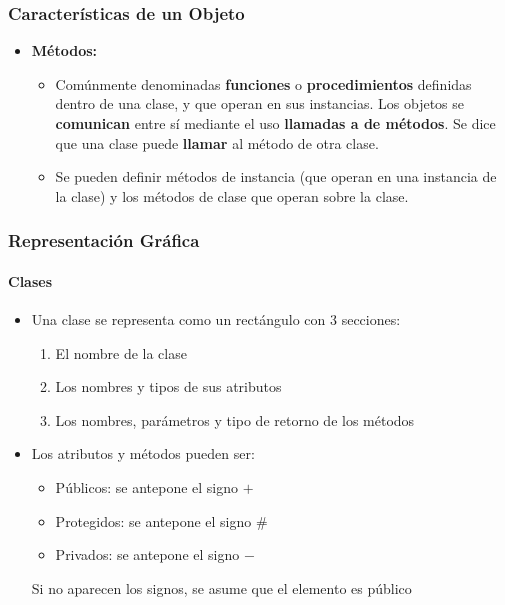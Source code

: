 \documentclass{beamer}
\begin{document}
\begin{frame}
  \frametitle{Características de un Objeto}

  \begin{itemize}
  \item \textbf{Métodos:}
    \begin{itemize}

    \item[] Comúnmente denominadas \textbf{funciones} o
      \textbf{procedimientos} definidas dentro de una clase, y que
      operan en sus instancias. Los objetos se \textbf{comunican}
      entre sí mediante el uso \textbf{llamadas a de métodos}. Se dice
      que una clase puede \textbf{llamar} al método de otra clase.
      
    \item[] Se pueden definir métodos de instancia (que operan en una
      instancia de la clase) y los métodos de clase que operan sobre
      la clase.
      
    \end{itemize}
  \end{itemize}
\end{frame}

\begin{frame}
  \frametitle{Representación Gráfica}
  \framesubtitle{Clases}

  \begin{itemize}
  \item Una clase se representa como un rectángulo con 3 secciones:
    \begin{enumerate}
    \item El nombre de la clase      
    \item Los nombres y tipos de sus atributos      
    \item Los nombres, parámetros y tipo de retorno de los métodos
    \end{enumerate}
    
  \item Los atributos y métodos pueden ser:
    \begin{itemize}
    \item Públicos: se antepone el signo $+$      
    \item Protegidos: se antepone el signo $\#$      
    \item Privados: se antepone el signo $-$
    \end{itemize}
    Si no aparecen los signos, se asume que el elemento es público
  \end{itemize}

\end{frame}
\end{document}
